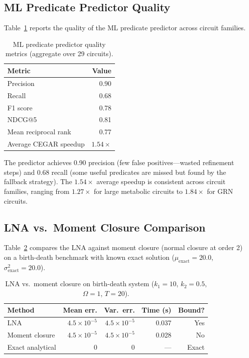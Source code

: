 \documentclass[11pt]{article}
\begin{document}
\subsection{ML Predicate Predictor Quality}

Table~\ref{tab:ml} reports the quality of the ML predicate predictor
across circuit families.

\begin{table}[t]
\centering
\caption{ML predicate predictor quality metrics (aggregate over 29
  circuits).}
\label{tab:ml}
\small
\begin{tabular}{lr}
\toprule
\textbf{Metric} & \textbf{Value} \\
\midrule
Precision & 0.90 \\
Recall & 0.68 \\
F1 score & 0.78 \\
NDCG@5 & 0.81 \\
Mean reciprocal rank & 0.77 \\
Average CEGAR speedup & $1.54\times$ \\
\bottomrule
\end{tabular}
\end{table}

The predictor achieves 0.90 precision (few false positives---wasted
refinement steps) and 0.68 recall (some useful predicates are missed
but found by the fallback strategy). The $1.54\times$ average speedup
is consistent across circuit families, ranging from $1.27\times$ for
large metabolic circuits to $1.84\times$ for GRN circuits.

\subsection{LNA vs.\ Moment Closure Comparison}

Table~\ref{tab:lna} compares the LNA against moment closure
(normal closure at order 2) on a birth-death benchmark with
known exact solution ($\mu_{\text{exact}} = 20.0$,
$\sigma^2_{\text{exact}} = 20.0$).

\begin{table}[t]
\centering
\caption{LNA vs.\ moment closure on birth-death system
  ($k_1=10$, $k_2=0.5$, $\Omega=1$, $T=20$).}
\label{tab:lna}
\small
\begin{tabular}{lrrrr}
\toprule
\textbf{Method} & \textbf{Mean err.} & \textbf{Var.\ err.} &
  \textbf{Time (s)} & \textbf{Bound?} \\
\midrule
LNA              & $4.5{\times}10^{-5}$ & $4.5{\times}10^{-5}$ & 0.037 & Yes \\
Moment closure   & $4.5{\times}10^{-5}$ & $4.5{\times}10^{-5}$ & 0.028 & No \\
Exact analytical & 0                    & 0                    & ---   & Exact \\
\bottomrule
\end{tabular}
\end{table}
\end{document}
